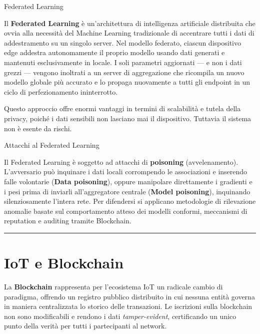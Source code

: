 \documentclass[
  italian,
  openany]{book}
\begin{document}
\begin{calloutdefinition}{Federated Learning}

Il \textbf{Federated Learning} è un'architettura di intelligenza
artificiale distribuita che ovvia alla necessità del Machine Learning
tradizionale di accentrare tutti i dati di addestramento su un singolo
server. Nel modello federato, ciascun dispositivo edge addestra
autonomamente il proprio modello usando dati generati e mantenuti
esclusivamente in locale. I soli parametri aggiornati --- e non i dati
grezzi --- vengono inoltrati a un server di aggregazione che ricompila
un nuovo modello globale più accurato e lo propaga nuovamente a tutti
gli endpoint in un ciclo di perfezionamento ininterrotto.

\end{calloutdefinition}

Questo approccio offre enormi vantaggi in termini di scalabilità e
tutela della privacy, poiché i dati sensibili non lasciano mai il
dispositivo. Tuttavia il sistema non è esente da rischi.

\begin{calloutwarning}{Attacchi al Federated Learning}

Il Federated Learning è soggetto ad attacchi di \textbf{poisoning}
(avvelenamento). L'avversario può inquinare i dati locali corrompendo le
associazioni e inserendo falle volontarie (\textbf{Data poisoning}),
oppure manipolare direttamente i gradienti e i pesi prima di inviarli
all'aggregatore centrale (\textbf{Model poisoning}), inquinando
silenziosamente l'intera rete. Per difendersi si applicano metodologie
di rilevazione anomalie basate sul comportamento atteso dei modelli
conformi, meccanismi di reputation e auditing tramite Blockchain.

\end{calloutwarning}

\begin{center}\rule{0.5\linewidth}{0.5pt}\end{center}

\section{IoT e Blockchain}\label{iot-e-blockchain}

La \textbf{Blockchain} rappresenta per l'ecosistema IoT un radicale
cambio di paradigma, offrendo un registro pubblico distribuito in cui
nessuna entità governa in maniera centralizzata lo storico delle
transazioni. Le iscrizioni sulla blockchain non sono modificabili e
rendono i dati \emph{tamper-evident}, certificando un unico punto della
verità per tutti i partecipanti al network.
\end{document}

